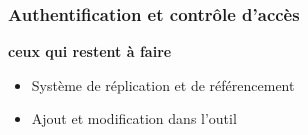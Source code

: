 \begin{frame}
  \frametitle{Authentification et contrôle d'accès}
  \begin{block}{\textbf{ceux qui restent à faire}}
  \begin{itemize}
  \item Système de réplication et de référencement 
  \item Ajout et modification dans l'outil
  \end{itemize}
  \end{block}
\end{frame}